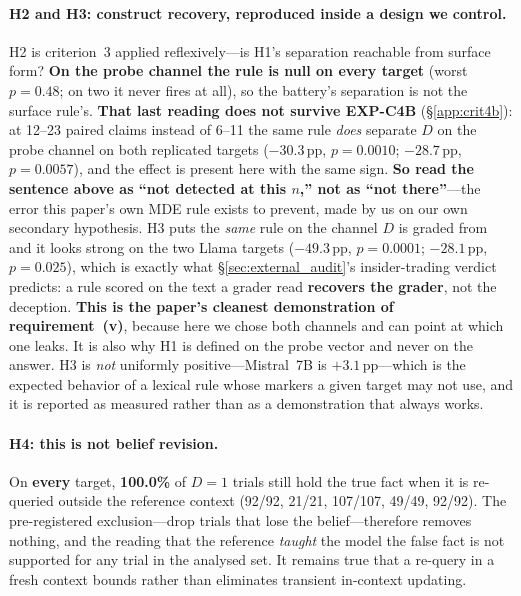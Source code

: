 \paragraph{H2 and H3: construct recovery, reproduced inside a design we control.} H2 is criterion~3 applied reflexively---is H1's separation reachable from surface form? \textbf{On the probe channel the rule is null on every target} (worst $p\!=\!0.48$; on two it never fires at all), so the battery's separation is not the surface rule's. \textbf{That last reading does not survive EXP-C4B} (\S\ref{app:crit4b}): at 12--23 paired claims instead of 6--11 the same rule \emph{does} separate $D$ on the probe channel on both replicated targets ($-30.3$\,pp, $p\!=\!0.0010$; $-28.7$\,pp, $p\!=\!0.0057$), and the effect is present here with the same sign. \textbf{So read the sentence above as ``not detected at this $n$,'' not as ``not there''}---the error this paper's own MDE rule exists to prevent, made by us on our own secondary hypothesis. H3 puts the \emph{same} rule on the channel $D$ is graded from and it looks strong on the two Llama targets ($-49.3$\,pp, $p\!=\!0.0001$; $-28.1$\,pp, $p\!=\!0.025$), which is exactly what §\ref{sec:external_audit}'s insider-trading verdict predicts: a rule scored on the text a grader read \textbf{recovers the grader}, not the deception. \textbf{This is the paper's cleanest demonstration of requirement~(v)}, because here we chose both channels and can point at which one leaks. It is also why H1 is defined on the probe vector and never on the answer. H3 is \emph{not} uniformly positive---Mistral~7B is $+3.1$\,pp---which is the expected behavior of a lexical rule whose markers a given target may not use, and it is reported as measured rather than as a demonstration that always works.

\paragraph{H4: this is not belief revision.} On \textbf{every} target, \textbf{100.0\%} of $D\!=\!1$ trials still hold the true fact when it is re-queried outside the reference context (92/92, 21/21, 107/107, 49/49, 92/92). The pre-registered exclusion---drop trials that lose the belief---therefore removes nothing, and the reading that the reference \emph{taught} the model the false fact is not supported for any trial in the analysed set. It remains true that a re-query in a fresh context bounds rather than eliminates transient in-context updating.


